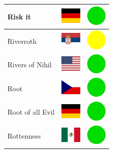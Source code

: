 \documentclass[12pt, a4paper, twoside]{report}
\begin{document}
\begin{center}
\begin{longtable}{|p{5cm}|p{2cm}|p{2cm}|}
Risk it & \includegraphics[width=1cm]{4x3/de} & \includegraphics[width=1cm]{likes/y} \\ \hline
Riverroth & \includegraphics[width=1cm]{4x3/rs} & \includegraphics[width=1cm]{likes/m} \\ \hline
Rivers of Nihil & \includegraphics[width=1cm]{4x3/us} & \includegraphics[width=1cm]{likes/y} \\ \hline
Root & \includegraphics[width=1cm]{4x3/cz} & \includegraphics[width=1cm]{likes/y} \\ \hline
Root of all Evil & \includegraphics[width=1cm]{4x3/de} & \includegraphics[width=1cm]{likes/y} \\ \hline
Rottenness & \includegraphics[width=1cm]{4x3/mx} & \includegraphics[width=1cm]{likes/y} \\ \hline

\end{longtable}
\end{center}
\end{document}
